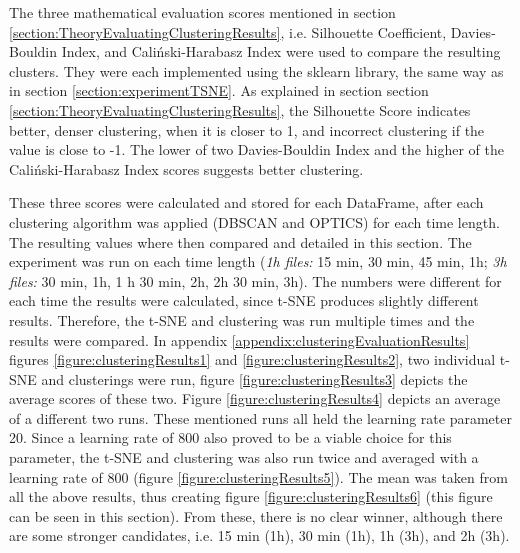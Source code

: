


The three mathematical evaluation scores mentioned in section \ref{section:TheoryEvaluatingClusteringResults}, i.e. Silhouette Coefficient, Davies-Bouldin Index, and Caliński-Harabasz Index were used to compare the resulting clusters.  They were each implemented using the sklearn library, the same way as in section \ref{section:experimentTSNE}.
As explained in section  section \ref{section:TheoryEvaluatingClusteringResults}, the Silhouette Score indicates better, denser clustering, when it is closer to 1, and incorrect clustering if the value is close to -1. The lower of two Davies-Bouldin Index and the higher of the Caliński-Harabasz Index scores suggests better clustering.


These three scores were calculated and stored for each DataFrame, after each clustering algorithm was applied (DBSCAN and OPTICS) for each time length. The resulting values where then compared and detailed in this section.
The experiment was run on each time length (\textit{1h files:} 15 min, 30 min, 45 min, 1h; \textit{3h files:} 30 min, 1h, 1 h 30 min, 2h, 2h 30 min, 3h).
The numbers were different for each time the results were calculated, since t-SNE produces slightly different results. Therefore, the t-SNE and clustering was run multiple times and the results were compared. In appendix \ref{appendix:clusteringEvaluationResults} figures \ref{figure:clusteringResults1} and \ref{figure:clusteringResults2}, two individual t-SNE and clusterings were run, figure \ref{figure:clusteringResults3} depicts the average scores of these two. Figure \ref{figure:clusteringResults4} depicts an average of a different two runs. These mentioned runs all held the learning rate parameter 20. Since a learning rate of 800 also proved to be a viable choice for this parameter, the t-SNE and clustering was also run twice and averaged with a learning rate of 800 (figure \ref{figure:clusteringResults5}). The mean was taken from all the above results, thus creating figure \ref{figure:clusteringResults6} (this figure can be seen in this section). From these, there is no clear winner, although there are some stronger candidates, i.e. 15 min (1h), 30 min (1h), 1h (3h), and 2h (3h). 

